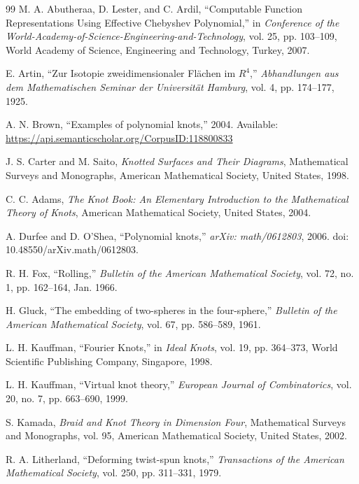 \documentclass[10pt,a4paper,reqno]{amsart}
\theoremstyle{definition}
\theoremstyle{remark}
\begin{document}
\begin{thebibliography}{99}
	M. A. Abutheraa, D. Lester, and C. Ardil,
	``Computable Function Representations Using Effective Chebyshev Polynomial,''
	in \emph{Conference of the World-Academy-of-Science-Engineering-and-Technology},
	vol. 25, pp. 103--109, World Academy of Science, Engineering and Technology, Turkey, 2007.
	
	E. Artin,
	``Zur Isotopie zweidimensionaler Flächen im $R^4$,''
	\emph{Abhandlungen aus dem Mathematischen Seminar der Universität Hamburg},
	vol. 4, pp. 174--177, 1925.
	
	A. N. Brown,
	``Examples of polynomial knots,'' 2004.
	Available: \url{https://api.semanticscholar.org/CorpusID:118800833}
	
	J. S. Carter and M. Saito,
	\emph{Knotted Surfaces and Their Diagrams},
	Mathematical Surveys and Monographs,
	American Mathematical Society, United States, 1998.
	
	C. C. Adams,
	\emph{The Knot Book: An Elementary Introduction to the Mathematical Theory of Knots},
	American Mathematical Society, United States, 2004.
	
	A. Durfee and D. O'Shea,
	``Polynomial knots,''
	\emph{arXiv: math/0612803}, 2006.
	doi: 10.48550/arXiv.math/0612803.
	
	R. H. Fox,
	``Rolling,''
	\emph{Bulletin of the American Mathematical Society},
	vol. 72, no. 1, pp. 162--164, Jan. 1966.
	
	H. Gluck,
	``The embedding of two-spheres in the four-sphere,''
	\emph{Bulletin of the American Mathematical Society},
	vol. 67, pp. 586--589, 1961.
	
	L. H. Kauffman,
	``Fourier Knots,''
	in \emph{Ideal Knots},
	vol. 19, pp. 364--373,
	World Scientific Publishing Company, Singapore, 1998.
	
	L. H. Kauffman,
	``Virtual knot theory,''
	\emph{European Journal of Combinatorics},
	vol. 20, no. 7, pp. 663--690, 1999.
	
	S. Kamada,
	\emph{Braid and Knot Theory in Dimension Four},
	Mathematical Surveys and Monographs, vol. 95,
	American Mathematical Society, United States, 2002.
	
	R. A. Litherland,
	``Deforming twist-spun knots,''
	\emph{Transactions of the American Mathematical Society},
	vol. 250, pp. 311--331, 1979.
	

\end{thebibliography}
\end{document}
